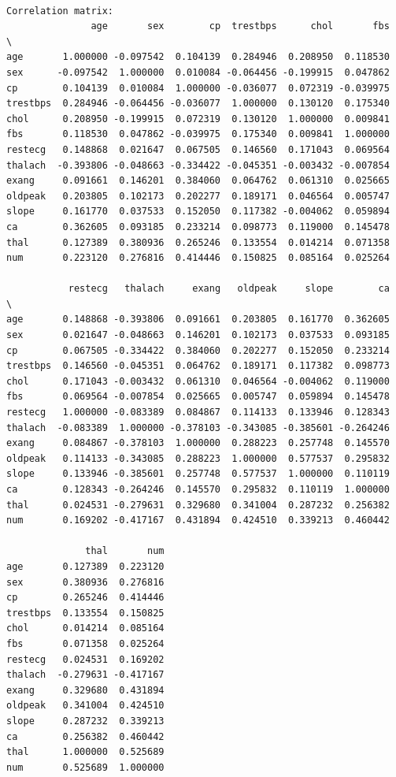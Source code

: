 \documentclass[
  11pt,
  letterpaper,
  DIV=11,
  numbers=noendperiod]{scrartcl}
\begin{document}
\begin{verbatim}

Correlation matrix:
               age       sex        cp  trestbps      chol       fbs  \
age       1.000000 -0.097542  0.104139  0.284946  0.208950  0.118530   
sex      -0.097542  1.000000  0.010084 -0.064456 -0.199915  0.047862   
cp        0.104139  0.010084  1.000000 -0.036077  0.072319 -0.039975   
trestbps  0.284946 -0.064456 -0.036077  1.000000  0.130120  0.175340   
chol      0.208950 -0.199915  0.072319  0.130120  1.000000  0.009841   
fbs       0.118530  0.047862 -0.039975  0.175340  0.009841  1.000000   
restecg   0.148868  0.021647  0.067505  0.146560  0.171043  0.069564   
thalach  -0.393806 -0.048663 -0.334422 -0.045351 -0.003432 -0.007854   
exang     0.091661  0.146201  0.384060  0.064762  0.061310  0.025665   
oldpeak   0.203805  0.102173  0.202277  0.189171  0.046564  0.005747   
slope     0.161770  0.037533  0.152050  0.117382 -0.004062  0.059894   
ca        0.362605  0.093185  0.233214  0.098773  0.119000  0.145478   
thal      0.127389  0.380936  0.265246  0.133554  0.014214  0.071358   
num       0.223120  0.276816  0.414446  0.150825  0.085164  0.025264   

           restecg   thalach     exang   oldpeak     slope        ca  \
age       0.148868 -0.393806  0.091661  0.203805  0.161770  0.362605   
sex       0.021647 -0.048663  0.146201  0.102173  0.037533  0.093185   
cp        0.067505 -0.334422  0.384060  0.202277  0.152050  0.233214   
trestbps  0.146560 -0.045351  0.064762  0.189171  0.117382  0.098773   
chol      0.171043 -0.003432  0.061310  0.046564 -0.004062  0.119000   
fbs       0.069564 -0.007854  0.025665  0.005747  0.059894  0.145478   
restecg   1.000000 -0.083389  0.084867  0.114133  0.133946  0.128343   
thalach  -0.083389  1.000000 -0.378103 -0.343085 -0.385601 -0.264246   
exang     0.084867 -0.378103  1.000000  0.288223  0.257748  0.145570   
oldpeak   0.114133 -0.343085  0.288223  1.000000  0.577537  0.295832   
slope     0.133946 -0.385601  0.257748  0.577537  1.000000  0.110119   
ca        0.128343 -0.264246  0.145570  0.295832  0.110119  1.000000   
thal      0.024531 -0.279631  0.329680  0.341004  0.287232  0.256382   
num       0.169202 -0.417167  0.431894  0.424510  0.339213  0.460442   

              thal       num  
age       0.127389  0.223120  
sex       0.380936  0.276816  
cp        0.265246  0.414446  
trestbps  0.133554  0.150825  
chol      0.014214  0.085164  
fbs       0.071358  0.025264  
restecg   0.024531  0.169202  
thalach  -0.279631 -0.417167  
exang     0.329680  0.431894  
oldpeak   0.341004  0.424510  
slope     0.287232  0.339213  
ca        0.256382  0.460442  
thal      1.000000  0.525689  
num       0.525689  1.000000  
\end{verbatim}
\end{document}
